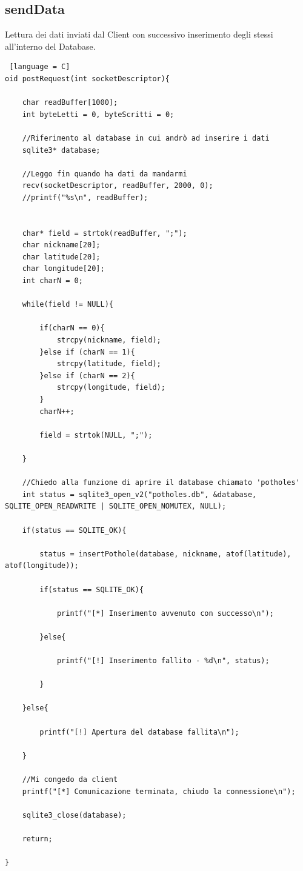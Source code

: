 \documentclass[a4paper,11pt]{report}
\begin{document}
\subsection{sendData}
Lettura dei dati inviati dal Client con successivo inserimento degli stessi all'interno del Database.
\begin{lstlisting} [language = C]
oid postRequest(int socketDescriptor){

    char readBuffer[1000];
    int byteLetti = 0, byteScritti = 0;

    //Riferimento al database in cui andrò ad inserire i dati
    sqlite3* database;

    //Leggo fin quando ha dati da mandarmi
    recv(socketDescriptor, readBuffer, 2000, 0);
    //printf("%s\n", readBuffer);


    char* field = strtok(readBuffer, ";");
    char nickname[20];
    char latitude[20];
    char longitude[20];
    int charN = 0;

    while(field != NULL){

        if(charN == 0){
            strcpy(nickname, field);
        }else if (charN == 1){
            strcpy(latitude, field);
        }else if (charN == 2){
            strcpy(longitude, field);
        }
        charN++;

        field = strtok(NULL, ";");

    }

    //Chiedo alla funzione di aprire il database chiamato 'potholes'
    int status = sqlite3_open_v2("potholes.db", &database, SQLITE_OPEN_READWRITE | SQLITE_OPEN_NOMUTEX, NULL);

    if(status == SQLITE_OK){

        status = insertPothole(database, nickname, atof(latitude), atof(longitude));

        if(status == SQLITE_OK){

            printf("[*] Inserimento avvenuto con successo\n");

        }else{

            printf("[!] Inserimento fallito - %d\n", status);

        }

    }else{

        printf("[!] Apertura del database fallita\n");

    }

    //Mi congedo da client
    printf("[*] Comunicazione terminata, chiudo la connessione\n");

    sqlite3_close(database);

    return;

}
\end{lstlisting}
\end{document}
